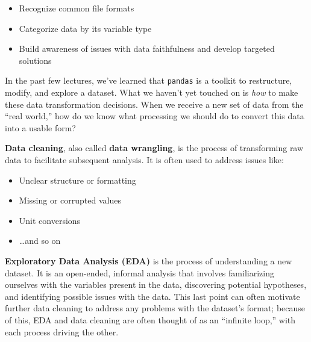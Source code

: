 \documentclass[
  letterpaper,
  DIV=11,
  numbers=noendperiod]{scrreprt}
\providecommand{\tightlist}{%
  \setlength{\itemsep}{0pt}\setlength{\parskip}{0pt}}\usepackage{longtable,booktabs,array}
\begin{document}
\begin{tcolorbox}[enhanced jigsaw, titlerule=0mm, bottomtitle=1mm, arc=.35mm, colframe=quarto-callout-note-color-frame, rightrule=.15mm, opacityback=0, opacitybacktitle=0.6, leftrule=.75mm, breakable, toprule=.15mm, colback=white, left=2mm, colbacktitle=quarto-callout-note-color!10!white, toptitle=1mm, bottomrule=.15mm, title=\textcolor{quarto-callout-note-color}{\faInfo}\hspace{0.5em}{Learning Outcomes}, coltitle=black]

\begin{itemize}
\tightlist
\item
  Recognize common file formats
\item
  Categorize data by its variable type
\item
  Build awareness of issues with data faithfulness and develop targeted
  solutions
\end{itemize}

\end{tcolorbox}

In the past few lectures, we've learned that \texttt{pandas} is a
toolkit to restructure, modify, and explore a dataset. What we haven't
yet touched on is \emph{how} to make these data transformation
decisions. When we receive a new set of data from the ``real world,''
how do we know what processing we should do to convert this data into a
usable form?

\textbf{Data cleaning}, also called \textbf{data wrangling}, is the
process of transforming raw data to facilitate subsequent analysis. It
is often used to address issues like:

\begin{itemize}
\tightlist
\item
  Unclear structure or formatting
\item
  Missing or corrupted values
\item
  Unit conversions
\item
  \ldots and so on
\end{itemize}

\textbf{Exploratory Data Analysis (EDA)} is the process of understanding
a new dataset. It is an open-ended, informal analysis that involves
familiarizing ourselves with the variables present in the data,
discovering potential hypotheses, and identifying possible issues with
the data. This last point can often motivate further data cleaning to
address any problems with the dataset's format; because of this, EDA and
data cleaning are often thought of as an ``infinite loop,'' with each
process driving the other.
\end{document}
